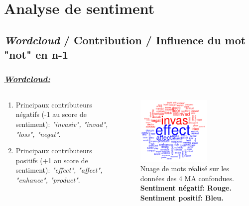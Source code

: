 \documentclass[xcolor=dvipsnames]{beamer}
\begin{document}
	\section*{Analyse de sentiment}
	\subsection*{\textit{Wordcloud} / Contribution / Influence du mot "not" en n-1}

	\begin{frame}
		\frametitle{\textit{\underline{Wordcloud:}}}
		\begin{columns}
			\begin{column}{0.5\textwidth} %
				\begin{enumerate}
					\item Principaux contributeurs négatifs (-1 au score de sentiment): \textit{"invasiv", "invad", "loss", "negat"}.
					\item Principaux contributeurs positifs (+1 au score de sentiment): \textit{"effect", "affect", "enhance", "product"}.
				\end{enumerate}
			\end{column}
			\begin{column}{0.5\textwidth}
				\begin{figure}[htb] %
					\begin{center} %
						\includegraphics[width=0.7\textwidth]{senti_cloud_all.png}
						\caption{Nuage de mots réalisé sur les données des 4 MA confondues. \textbf{Sentiment négatif: Rouge. Sentiment positif: Bleu.}}\label{senti_wc}
					\end{center}
				\end{figure}
			\end{column}
		\end{columns}
	\end{frame}
\end{document}
